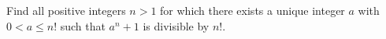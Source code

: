 Find all positive integers $n > 1$ for which there exists a unique integer $a$ with $0 < a \leq n!$ such that $a^n + 1$ is divisible by $n!$.
